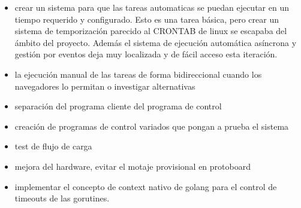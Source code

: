 \begin{itemize}
    \item crear un sistema para que las tareas automaticas se puedan ejecutar en un tiempo requerido y configurado. Esto es una tarea básica, pero crear un sistema de temporización parecido al CRONTAB de linux se escapaba del ámbito del proyecto. Además el sistema de ejecución automática asíncrona y gestión por eventos deja muy localizada y de fácil acceso esta iteración.
    \item la ejecución manual de las tareas de forma bidireccional cuando los navegadores lo permitan o investigar alternativas
    \item separación del programa cliente del programa de control
    \item creación de programas de control variados que pongan a prueba el sistema
    \item test de flujo de carga
    \item mejora del hardware, evitar el motaje provisional en protoboard
    \item implementar el concepto de context nativo de golang para el control de timeouts de las gorutines.
\end{itemize}
